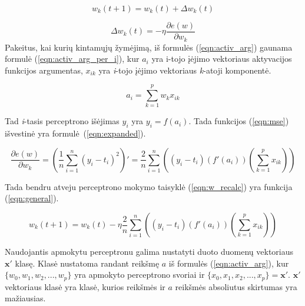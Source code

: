 \begin{equation}
	\label{eqn:w_recalc}
	w_k(t + 1) = w_k(t) + \Delta w_k(t)
\end{equation}

\begin{equation}
	\label{eqn:w_change}
	\Delta w_k(t) = - \eta \dfrac{\partial e(w)}{\partial w_k}
\end{equation}
Pakeitus, kai kurių kintamųjų žymėjimą, iš formulės (\ref{eqn:activ_arg}) gaunama formulė (\ref{eqn:activ_arg_per_i}), kur $a_i$ yra i-tojo įėjimo vektoriaus aktyvacijos funkcijos argumentas, $x_{ik}$ yra \textit{i}-tojo įėjimo vektoriaus \textit{k}-atoji komponentė.

\begin{equation}
	\label{eqn:activ_arg_per_i}
	a_i = \sum_{k = 1}^{p} w_{k}x_{ik}
\end{equation}

Tad \textit{i}-tasis perceptrono išėjimas $y_i$ yra $y_i = f(a_i)$. Tada funkcijos (\ref{eqn:mse}) išvestinė yra formulė~(\ref{eqn:expanded}).

\begin{equation}
	\label{eqn:expanded}
	\dfrac{\partial e(w)}{\partial w_k} = (\dfrac{1}{n}\sum_{i=1}^{n} (y_i - t_i)^2)'
		= \dfrac{2}{n}\sum_{i=1}^{n}
			((y_i - t_i)(f'(a_i))(\sum_{k = 1}^{p} x_{ik}))
\end{equation}

Tada bendru atveju perceptrono mokymo taisyklė (\ref{eqn:w_recalc}) yra funkcija (\ref{eqn:general}).

\begin{equation}
	\label{eqn:general}
	w_k(t + 1) = w_k(t) - \eta \dfrac{2}{n}\sum_{i=1}^{n} ((y_i - t_i)(f'(a_i))(\sum_{k = 1}^{p} x_{ik}))
\end{equation}

Naudojantis apmokytu perceptronu galima nustatyti duoto duomenų vektoriaus $\boldsymbol{x}'$ klasę. Klasė nustatoma randant reikšmę $a$ iš formulės (\ref{eqn:activ_arg}), kur $\{w_{0}, w_{1}, w_{2}, ..., w_{p}\}$ yra apmokyto perceptrono svoriai ir $\{x_{0}, x_{1}, x_{2}, ..., x_{p}\} = \boldsymbol{x}'$. $\boldsymbol{x}'$ vektoriaus klasė yra klasė, kurios reikšmės ir $a$ reikšmės absoliutus skirtumas yra mažiausias.
